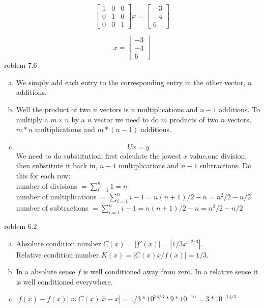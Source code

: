 \documentclass[12pt]{article}
\makeatletter
\theoremstyle{homework}
\newenvironment{exercise}[1]
{\def\@currentlabel{#1}\exercisecore}
{\endexercisecore}
\makeatother
\begin{document}
$$
\begin{bmatrix}
1&0&0\\
0&1&0\\
0&0&1
\end{bmatrix}
x=\begin{bmatrix}
-3\\
-4\\
6
\end{bmatrix}$$

$$x=\begin{bmatrix}
-3\\
-4\\
6
\end{bmatrix}$$
\begin{exercise}

Problem 7.6
\end{exercise}
\begin{enumerate}[(a)]
\item
We simply add each entry to the corresponding entry in the other vector, $n$ additions.
\item
Well the product of two $n$ vectors is $n$ multiplications and $n-1$ additions.  To multiply a $m\times n$ by a $n$ vector we need to do $m$ products of two $n$ vectors, $m*n$ multiplications and $m*(n-1)$ additions.
\item
$$Ux=y$$
We need to do substitution, first calculate the lowest $x$ value,one division, then substitute it back in, $n-1$ multiplications and $n-1$ subtractions.  Do this for each row:\\
number of divisions $=\sum_{i=1}^{n}1=n$\\
number of multiplications $=\sum_{i=1}^{n}i-1=n(n+1)/2-n=n^2/2-n/2$\\
number of subtractions $=\sum_{i=1}^{n}i-1=n(n+1)/2-n=n^2/2-n/2$\\
\end{enumerate}
\begin{exercise}

Problem 6.2
\end{exercise}
\begin{enumerate}[(a)]
\item
Absolute condition number $C(x)=|f'(x)|=|1/3x^{-2/3}|$.\\
Relative condition number $K(x)=|C(x)x/f(x)|=1/3$.\\
\item
In a absolute sense $f$ is well conditioned away from zero.  In a relative sense it is well conditioned everywhere.
\item
$|f(\hat{x})-f(x)|\approx C(x)|\hat{x}-x|=1/3*10^{34/3}*9*10^{-16}=3*10^{-14/3}$
\end{enumerate}
\end{document}
